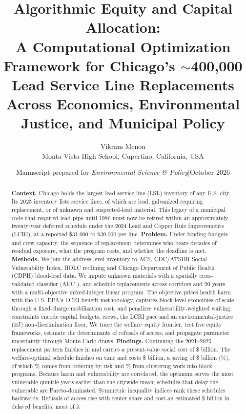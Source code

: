\documentclass[11pt]{article}
\title{\textbf{Algorithmic Equity and Capital Allocation:}\\[2pt]
A Computational Optimization Framework for Chicago's $\sim$400,000 Lead Service Line
Replacements Across Economics, Environmental Justice, and Municipal Policy}
\author{Vikram Menon\\[2pt]\small Monta Vista High School, Cupertino, California, USA}
\date{\small Manuscript prepared for \emph{Environmental Science \& Policy}\quad|\quad October 2026}
\begin{document}
\maketitle

\begin{abstract}
\noindent\textbf{Context.} Chicago holds the largest lead service line (LSL) inventory of any
U.S. city. Its 2025 inventory lists \NLines{} service lines, of which \NAction{} are lead,
galvanized requiring replacement, or of unknown and suspected-lead material. This legacy of a
municipal code that required lead pipe until 1986 must now be retired within an approximately
twenty-year deferred schedule under the 2024 Lead and Copper Rule Improvements (LCRI), at a
reported \$31,000 to \$39,000 per line.
\textbf{Problem.} Under binding budgets and crew capacity, the sequence of replacement determines
who bears decades of residual exposure, what the program costs, and whether the deadline is met.
\textbf{Methods.} We join the address-level inventory to ACS, CDC/ATSDR Social Vulnerability
Index, HOLC redlining and Chicago Department of Public Health (CDPH) blood-lead data. We impute
unknown materials with a spatially cross-validated classifier (AUC \ImpAUC), and schedule
replacements across \NZones{} corridors and 20 years with a multi-objective mixed-integer linear
program. The objective prices health harm with the U.S. EPA's LCRI benefit methodology, captures
block-level economies of scale through a fixed-charge mobilization cost, and penalizes
vulnerability-weighted waiting; constraints encode capital budgets, crews, the LCRI pace and an
environmental-justice (EJ) non-discrimination floor. We trace the welfare--equity frontier, test
five equity frameworks, estimate the determinants of refusals of access, and propagate parameter
uncertainty through \PsaN{} Monte Carlo draws.
\textbf{Findings.} Continuing the 2021--2025 replacement pattern finishes in \SQCompletion{} and
carries a present-value social cost of \$\SQSocial{} billion. The welfare-optimal schedule finishes
on time and costs \$\HWSocial{} billion, a saving of \$\DecTotal{} billion (\GainPct\%), of which
\DecOrderPct\% comes from ordering by risk and \DecClusterPct\% from clustering work into block
programs. Because harm and vulnerability are correlated, the optimum serves the most vulnerable
quintile \HWGapAbs{} years earlier than the citywide mean; schedules that delay the vulnerable are
Pareto-dominated. Symmetric inequality indices rank these schedules backwards. Refusals of access
rise with renter share and cost an estimated \$\RefCost{} billion in delayed benefits, most of it

\end{abstract}
\end{document}
